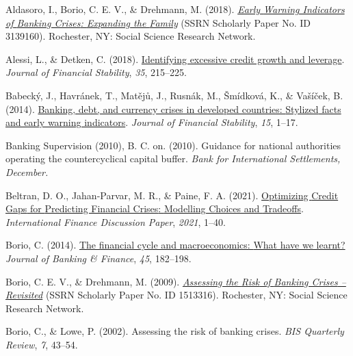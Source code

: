 \documentclass[
  12pt,
]{article}
\newlength{\cslhangindent}
\newlength{\cslentryspacingunit} %
\newenvironment{CSLReferences}[2] %
 {%
  \setlength{\parindent}{0pt}
  \ifodd #1
  \let\oldpar\par
  \def\par{\hangindent=\cslhangindent\oldpar}
  \fi
  \setlength{\parskip}{#2\cslentryspacingunit}
 }%
 {}
\begin{document}
\hypertarget{refs}{}
\begin{CSLReferences}{1}{0}
\leavevmode{}%
Aldasoro, I., Borio, C. E. V., \& Drehmann, M. (2018). \emph{\href{https://papers.ssrn.com/abstract=3139160}{Early {Warning Indicators} of {Banking Crises}: {Expanding} the {Family}}} (SSRN Scholarly Paper No. ID 3139160). {Rochester, NY}: {Social Science Research Network}.

\leavevmode{}%
Alessi, L., \& Detken, C. (2018). \href{https://doi.org/10.1016/j.jfs.2017.06.005}{Identifying excessive credit growth and leverage}. \emph{Journal of Financial Stability}, \emph{35}, 215--225.

\leavevmode{}%
Babecký, J., Havránek, T., Matějů, J., Rusnák, M., Šmídková, K., \& Vašíček, B. (2014). \href{https://doi.org/10.1016/j.jfs.2014.07.001}{Banking, debt, and currency crises in developed countries: {Stylized} facts and early warning indicators}. \emph{Journal of Financial Stability}, \emph{15}, 1--17.

\leavevmode{}%
Banking Supervision (2010), B. C. on. (2010). Guidance for national authorities operating the countercyclical capital buffer. \emph{Bank for International Settlements, December.}

\leavevmode{}%
Beltran, D. O., Jahan-Parvar, M. R., \& Paine, F. A. (2021). \href{https://doi.org/10.17016/IFDP.2021.1307}{Optimizing {Credit Gaps} for {Predicting Financial Crises}: {Modelling Choices} and {Tradeoffs}}. \emph{International Finance Discussion Paper}, \emph{2021}, 1--40.

\leavevmode{}%
Borio, C. (2014). \href{https://doi.org/10.1016/j.jbankfin.2013.07.031}{The financial cycle and macroeconomics: {What} have we learnt?} \emph{Journal of Banking \& Finance}, \emph{45}, 182--198.

\leavevmode{}%
Borio, C. E. V., \& Drehmann, M. (2009). \emph{\href{https://papers.ssrn.com/abstract=1513316}{Assessing the {Risk} of {Banking Crises} -- {Revisited}}} (SSRN Scholarly Paper No. ID 1513316). {Rochester, NY}: {Social Science Research Network}.

\leavevmode{}%
Borio, C., \& Lowe, P. (2002). Assessing the risk of banking crises. \emph{BIS Quarterly Review}, \emph{7}, 43--54.


\end{CSLReferences}
\end{document}

